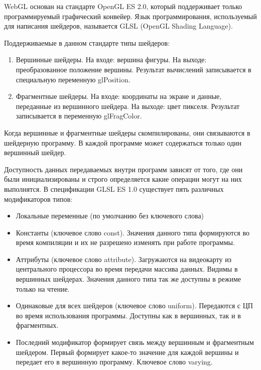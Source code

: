 WebGL основан на стандарте OpenGL ES 2.0, который поддерживает только программируемый графический
конвейер. Язык программирования, используемый для написания шейдеров, называется GLSL (OpenGL
Shading Language).

Поддерживаемые в данном стандарте типы шейдеров:

\begin{enumerate}
  \item Вершинные шейдеры. На входе: вершина фигуры. На выходе: преобразованное положение
    вершины. Результат вычислений записывается в специальную переменную gl\textunderscore{}Position.
  \item Фрагментные шейдеры. На входе: координаты на экране и данные, переданные из вершинного 
    шейдера. На выходе: цвет пикселя. Результат записывается в переменную gl\textunderscore{}FragColor.
\end{enumerate}

Когда вершинные и фрагментные шейдеры скомпилированы, они связываются в шейдерную программу.
В каждой программе может содержаться только один вершинный шейдер.

Доступность данных передаваемых внутри программ зависят от того, где они были инициализированы
и строго определяется какие операции могут на них выполнятся. В спецификации GLSL ES 1.0 
существует пять различных модификаторов типов:

\begin{itemize}
  \item Локальные переменные (по умолчанию без ключевого слова)
  \item Константы (ключевое слово const). Значения данного типа формируются во время компиляции и их не
    разрешено изменять при работе программы.
  \item Аттрибуты (ключевое слово attribute). Загружаются на видеокарту из центрального процессора во время передачи массива данных. Видимы в 
    вершинных шейдерах. Значения данного типа так же доступны в режиме только на чтение.
  \item Одинаковые для всех шейдеров (ключевое слово uniform). Передаются с ЦП во время 
    использования программы. Доступны как в вершинных, так и в фрагментных.
  \item Последний модификатор формирует связь между вершинным и фрагментным шейдером. Первый
    формирует какое-то значение для каждой вершины и передает его в вершинную программу.
    Ключевое слово varying.
\end{itemize}

